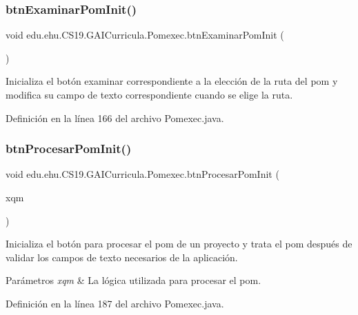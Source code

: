 \subsubsection{\texorpdfstring{btnExaminarPomInit()}{btnExaminarPomInit()}}
{\footnotesize\ttfamily void edu.\+ehu.\+C\+S19.\+G\+A\+I\+Curricula.\+Pomexec.\+btn\+Examinar\+Pom\+Init (\begin{DoxyParamCaption}{ }\end{DoxyParamCaption})}



Inicializa el botón examinar correspondiente a la elección de la ruta del pom y modifica su campo de texto correspondiente cuando se elige la ruta. 



Definición en la línea 166 del archivo Pomexec.\+java.

\mbox{\label{a00029_a9bc18b3b0b00c0c7cd1e2852abefd3aa}} 
\subsubsection{\texorpdfstring{btnProcesarPomInit()}{btnProcesarPomInit()}}
{\footnotesize\ttfamily void edu.\+ehu.\+C\+S19.\+G\+A\+I\+Curricula.\+Pomexec.\+btn\+Procesar\+Pom\+Init (\begin{DoxyParamCaption}\item[{\mbox{\hyperlink{a00033}{X\+Query\+Methods}}}]{xqm }\end{DoxyParamCaption})}



Inicializa el botón para procesar el pom de un proyecto y trata el pom después de validar los campos de texto necesarios de la aplicación. 


\begin{DoxyParams}{Parámetros}
{\em xqm} & La lógica utilizada para procesar el pom. \\
\hline
\end{DoxyParams}


Definición en la línea 187 del archivo Pomexec.\+java.

\mbox{\label{a00029_aea79b02cfc8fae015e78943e32710210}} 
